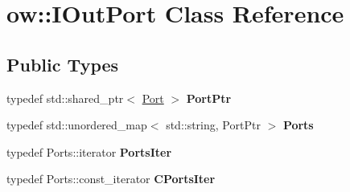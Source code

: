\hypertarget{classow_1_1IOutPort}{}\section{ow\+:\+:I\+Out\+Port Class Reference}
\label{classow_1_1IOutPort}
\subsection*{Public Types}
\begin{DoxyCompactItemize}
\item 
typedef std\+::shared\+\_\+ptr$<$ \hyperlink{classow_1_1Port}{Port} $>$ {\bfseries Port\+Ptr}\hypertarget{classow_1_1IOutPort_aecc57a3f70977b2d050ec7c77dfa0dd2}{}\label{classow_1_1IOutPort_aecc57a3f70977b2d050ec7c77dfa0dd2}

\item 
typedef std\+::unordered\+\_\+map$<$ std\+::string, Port\+Ptr $>$ {\bfseries Ports}\hypertarget{classow_1_1IOutPort_a55db937011bb4a97c76494558c3251e9}{}\label{classow_1_1IOutPort_a55db937011bb4a97c76494558c3251e9}

\item 
typedef Ports\+::iterator {\bfseries Ports\+Iter}\hypertarget{classow_1_1IOutPort_a6a59becb83554bb9762b734ef4d44176}{}\label{classow_1_1IOutPort_a6a59becb83554bb9762b734ef4d44176}

\item 
typedef Ports\+::const\+\_\+iterator {\bfseries C\+Ports\+Iter}\hypertarget{classow_1_1IOutPort_a23832e348979a296a4d3a93e334ffdff}{}\label{classow_1_1IOutPort_a23832e348979a296a4d3a93e334ffdff}

\end{DoxyCompactItemize}
